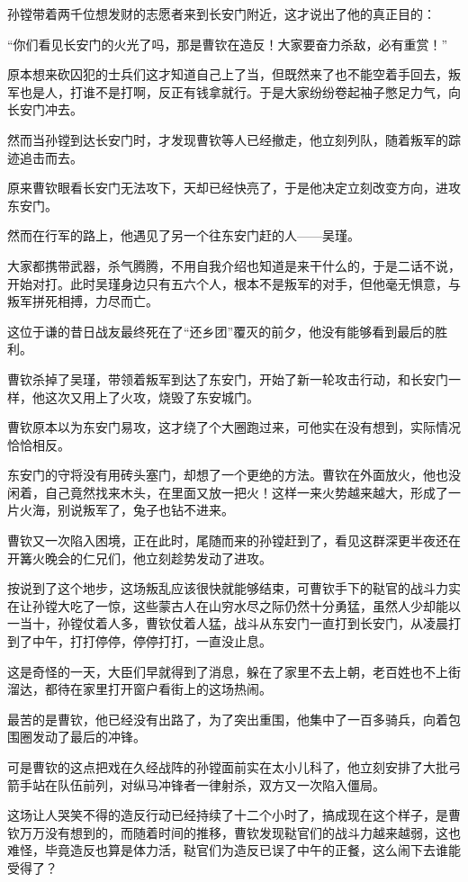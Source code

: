 \begin{multicols}{\theparacolNo}
孙镗带着两千位想发财的志愿者来到长安门附近，这才说出了他的真正目的：

“你们看见长安门的火光了吗，那是曹钦在造反！大家要奋力杀敌，必有重赏！”

原本想来砍囚犯的士兵们这才知道自己上了当，但既然来了也不能空着手回去，叛军也是人，打谁不是打啊，反正有钱拿就行。于是大家纷纷卷起袖子憋足力气，向长安门冲去。

然而当孙镗到达长安门时，才发现曹钦等人已经撤走，他立刻列队，随着叛军的踪迹追击而去。

原来曹钦眼看长安门无法攻下，天却已经快亮了，于是他决定立刻改变方向，进攻东安门。

然而在行军的路上，他遇见了另一个往东安门赶的人——吴瑾。

大家都携带武器，杀气腾腾，不用自我介绍也知道是来干什么的，于是二话不说，开始对打。此时吴瑾身边只有五六个人，根本不是叛军的对手，但他毫无惧意，与叛军拼死相搏，力尽而亡。

这位于谦的昔日战友最终死在了“还乡团”覆灭的前夕，他没有能够看到最后的胜利。

曹钦杀掉了吴瑾，带领着叛军到达了东安门，开始了新一轮攻击行动，和长安门一样，他这次又用上了火攻，烧毁了东安城门。

曹钦原本以为东安门易攻，这才绕了个大圈跑过来，可他实在没有想到，实际情况恰恰相反。

东安门的守将没有用砖头塞门，却想了一个更绝的方法。曹钦在外面放火，他也没闲着，自己竟然找来木头，在里面又放一把火！这样一来火势越来越大，形成了一片火海，别说叛军了，兔子也钻不进来。

曹钦又一次陷入困境，正在此时，尾随而来的孙镗赶到了，看见这群深更半夜还在开篝火晚会的仁兄们，他立刻趁势发动了进攻。

按说到了这个地步，这场叛乱应该很快就能够结束，可曹钦手下的鞑官的战斗力实在让孙镗大吃了一惊，这些蒙古人在山穷水尽之际仍然十分勇猛，虽然人少却能以一当十，孙镗仗着人多，曹钦仗着人猛，战斗从东安门一直打到长安门，从凌晨打到了中午，打打停停，停停打打，一直没止息。

这是奇怪的一天，大臣们早就得到了消息，躲在了家里不去上朝，老百姓也不上街溜达，都待在家里打开窗户看街上的这场热闹。

最苦的是曹钦，他已经没有出路了，为了突出重围，他集中了一百多骑兵，向着包围圈发动了最后的冲锋。

可是曹钦的这点把戏在久经战阵的孙镗面前实在太小儿科了，他立刻安排了大批弓箭手站在队伍前列，对纵马冲锋者一律射杀，双方又一次陷入僵局。

这场让人哭笑不得的造反行动已经持续了十二个小时了，搞成现在这个样子，是曹钦万万没有想到的，而随着时间的推移，曹钦发现鞑官们的战斗力越来越弱，这也难怪，毕竟造反也算是体力活，鞑官们为造反已误了中午的正餐，这么闹下去谁能受得了？


\end{multicols}
